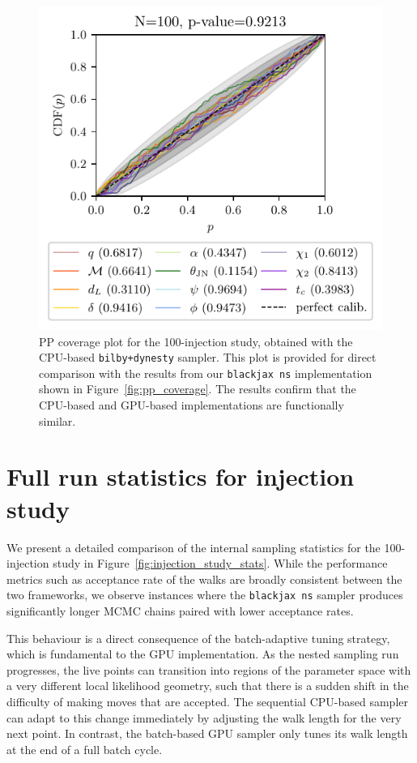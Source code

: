 \documentclass[fleqn,usenatbib]{mnras}
\begin{document}
\begin{figure}
    \centering
    \includegraphics[width=\columnwidth]{figures/pp_coverage_bilby.pdf}
    \caption{PP coverage plot for the 100-injection study, obtained
    with the CPU-based \texttt{bilby+dynesty} sampler. This plot is
    provided for direct comparison with the results from our
    \texttt{blackjax ns} implementation shown in
    Figure~\ref{fig:pp_coverage}. The results confirm that the CPU-based
    and GPU-based implementations are functionally similar.}
    \label{fig:pp_coverage_bilby}
\end{figure}

\section{Full run statistics for injection study}
\label{app:injection_study_stats}

We present a detailed comparison of the internal sampling statistics for
the 100-injection study in Figure~\ref{fig:injection_study_stats}.
While the performance metrics such as acceptance rate of the walks are broadly
consistent between the two frameworks, we observe instances where the
\texttt{blackjax ns} sampler produces significantly longer MCMC chains
paired with lower acceptance rates.

This behaviour is a direct consequence of the batch-adaptive tuning
strategy, which is fundamental to the GPU implementation. As the nested
sampling run progresses, the live points can transition into regions of
the parameter space with a very different local likelihood geometry, such that there
is a sudden shift in the difficulty of making moves that are accepted. 
The sequential CPU-based
sampler can adapt to this change immediately by adjusting the walk
length for the very next point. In contrast, the batch-based GPU
sampler only tunes its walk length at the end of a full batch cycle.
\end{document}
